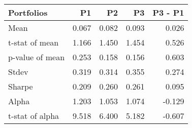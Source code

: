 \begin{tabular}{lrrrr}
\toprule
Portfolios & P1 & P2 & P3 & P3 - P1 \\
\midrule
Mean & 0.067 & 0.082 & 0.093 & 0.026 \\
t-stat of mean & 1.166 & 1.450 & 1.454 & 0.526 \\
p-value of mean & 0.253 & 0.158 & 0.156 & 0.603 \\
Stdev & 0.319 & 0.314 & 0.355 & 0.274 \\
Sharpe & 0.209 & 0.260 & 0.261 & 0.095 \\
Alpha & 1.203 & 1.053 & 1.074 & -0.129 \\
t-stat of alpha & 9.518 & 6.400 & 5.182 & -0.607 \\
\bottomrule
\end{tabular}
